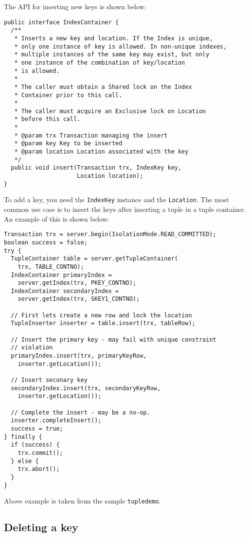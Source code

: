 \documentclass[a4paper,draft,oneside]{book}
\begin{document}
The API for inserting new keys is shown below:

\begin{verbatim}
public interface IndexContainer {
  /**
   * Inserts a new key and location. If the Index is unique, 
   * only one instance of key is allowed. In non-unique indexes, 
   * multiple instances of the same key may exist, but only
   * one instance of the combination of key/location
   * is allowed.
   *
   * The caller must obtain a Shared lock on the Index 
   * Container prior to this call.
   * 
   * The caller must acquire an Exclusive lock on Location 
   * before this call.
   * 
   * @param trx Transaction managing the insert
   * @param key Key to be inserted
   * @param location Location associated with the key
   */
  public void insert(Transaction trx, IndexKey key, 
                     Location location);
}
\end{verbatim}

To add a key, you need the \verb|IndexKey| instance and the
\verb|Location|. The most common use case is to insert the keys
after inserting a tuple in a tuple container. An example of this is
shown below:

\begin{verbatim}
Transaction trx = server.begin(IsolationMode.READ_COMMITTED);
boolean success = false;
try {
  TupleContainer table = server.getTupleContainer(
    trx, TABLE_CONTNO);
  IndexContainer primaryIndex = 
    server.getIndex(trx, PKEY_CONTNO);
  IndexContainer secondaryIndex = 
    server.getIndex(trx, SKEY1_CONTNO);

  // First lets create a new row and lock the location
  TupleInserter inserter = table.insert(trx, tableRow);

  // Insert the primary key - may fail with unique constraint
  // violation
  primaryIndex.insert(trx, primaryKeyRow, 
    inserter.getLocation());
  
  // Insert seconary key
  secondaryIndex.insert(trx, secondaryKeyRow, 
    inserter.getLocation());

  // Complete the insert - may be a no-op.
  inserter.completeInsert();
  success = true;
} finally {
  if (success) {
    trx.commit();
  } else {
    trx.abort();
  }
}
\end{verbatim}

Above example is taken from the sample \verb|tupledemo|. 

\subsection{Deleting a key}
\label{sec:delkey}
\end{document}

